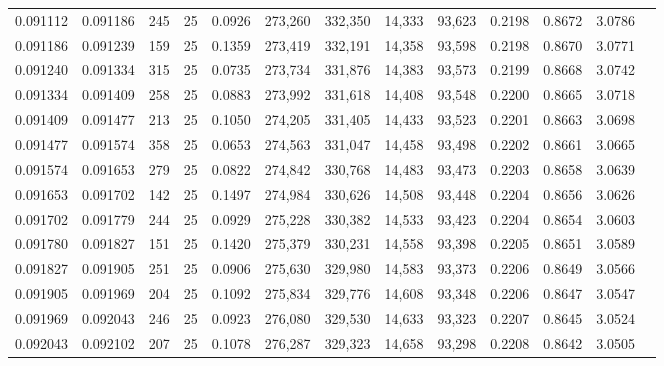 \begin{tabular}{rrrrrrrrrrrrr}
0.091112 & 0.091186 &   245 &  25 &                                     0.0926 & 273,260 & 332,350 &  14,333 &  93,623 & 0.2198 & 0.8672 & 3.0786 \\
0.091186 & 0.091239 &   159 &  25 &                                     0.1359 & 273,419 & 332,191 &  14,358 &  93,598 & 0.2198 & 0.8670 & 3.0771 \\
0.091240 & 0.091334 &   315 &  25 &                                     0.0735 & 273,734 & 331,876 &  14,383 &  93,573 & 0.2199 & 0.8668 & 3.0742 \\
0.091334 & 0.091409 &   258 &  25 &                                     0.0883 & 273,992 & 331,618 &  14,408 &  93,548 & 0.2200 & 0.8665 & 3.0718 \\
0.091409 & 0.091477 &   213 &  25 &                                     0.1050 & 274,205 & 331,405 &  14,433 &  93,523 & 0.2201 & 0.8663 & 3.0698 \\
0.091477 & 0.091574 &   358 &  25 &                                     0.0653 & 274,563 & 331,047 &  14,458 &  93,498 & 0.2202 & 0.8661 & 3.0665 \\
0.091574 & 0.091653 &   279 &  25 &                                     0.0822 & 274,842 & 330,768 &  14,483 &  93,473 & 0.2203 & 0.8658 & 3.0639 \\
0.091653 & 0.091702 &   142 &  25 &                                     0.1497 & 274,984 & 330,626 &  14,508 &  93,448 & 0.2204 & 0.8656 & 3.0626 \\
0.091702 & 0.091779 &   244 &  25 &                                     0.0929 & 275,228 & 330,382 &  14,533 &  93,423 & 0.2204 & 0.8654 & 3.0603 \\
0.091780 & 0.091827 &   151 &  25 &                                     0.1420 & 275,379 & 330,231 &  14,558 &  93,398 & 0.2205 & 0.8651 & 3.0589 \\
0.091827 & 0.091905 &   251 &  25 &                                     0.0906 & 275,630 & 329,980 &  14,583 &  93,373 & 0.2206 & 0.8649 & 3.0566 \\
0.091905 & 0.091969 &   204 &  25 &                                     0.1092 & 275,834 & 329,776 &  14,608 &  93,348 & 0.2206 & 0.8647 & 3.0547 \\
0.091969 & 0.092043 &   246 &  25 &                                     0.0923 & 276,080 & 329,530 &  14,633 &  93,323 & 0.2207 & 0.8645 & 3.0524 \\
0.092043 & 0.092102 &   207 &  25 &                                     0.1078 & 276,287 & 329,323 &  14,658 &  93,298 & 0.2208 & 0.8642 & 3.0505 \\

\end{tabular}
